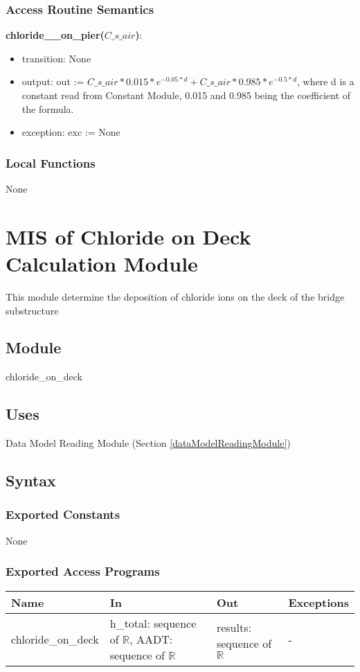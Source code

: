 \documentclass[12pt, titlepage]{article}
\begin{document}
\subsubsection{Access Routine Semantics}

\noindent \textbf{chloride\_\_on\_pier($C\_s\_air$)}:
\begin{itemize}
\item transition: None
\item output: out := $C\_s\_air * 0.015 * e^{-0.05*d}  + C\_s\_air*0.985 * e^{-0.5*d}$, where d is a constant read from Constant Module, 0.015 and 0.985 being the coefficient of the formula.
\item exception: exc := None
\end{itemize}

\subsubsection{Local Functions}
None
\newpage


\section{MIS of Chloride on Deck Calculation Module} \label{chlorideonDeckCalculationModule}
This module determine the deposition of chloride ions on the deck of the bridge substructure
\subsection{Module}
chloride\_on\_deck

\subsection{Uses}
Data Model Reading Module (Section \ref{dataModelReadingModule})

\subsection{Syntax}

\subsubsection{Exported Constants}
None
\subsubsection{Exported Access Programs}

\begin{center}
\begin{tabular}{p{4cm} p{4.5cm} p{4cm} p{2cm}}
\hline
\textbf{Name} & \textbf{In} & \textbf{Out} & \textbf{Exceptions} \\
\hline
chloride\_on\_deck & h\_total: sequence of $\mathbb{R}$, AADT: sequence of $\mathbb{R}$ & results: sequence of $\mathbb{R}$ & - \\

\hline
\end{tabular}
\end{center}
\end{document}
